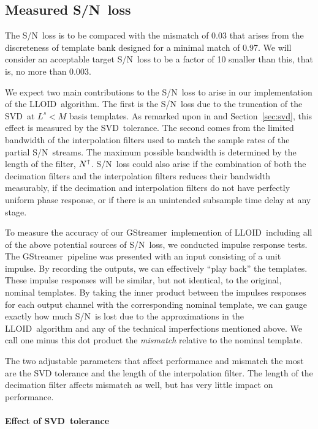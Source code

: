 \documentclass[preprint2]{aastex}
\newcommand{\SNR}{S/N}%
\newcommand{\SVD}{SVD}%
\newcommand{\gstreamer}{GStreamer}
\newcommand{\lloid}{LLOID}%
\begin{document}
\subsection{Measured \SNR\ loss}

The \SNR\ loss is to be compared with the mismatch of 0.03 that arises from the
discreteness of template bank designed for a minimal match of 0.97.  We will consider
an acceptable target \SNR\ loss to be a factor of 10 smaller than this, that is, no more
than 0.003.

We expect two main contributions to the \SNR\ loss to arise in our
implementation of the \lloid\ algorithm.  The first is the \SNR\ loss due to
the truncation of the \SVD\ at $L^s < M$ basis templates.  As remarked upon in
\citet{Cannon:2010p10398} and Section~\ref{sec:svd}, this effect is measured by
the \SVD\ tolerance.  The second comes from the limited bandwidth of the
interpolation filters used to match the sample rates of the partial \SNR\ streams.
The maximum possible bandwidth is determined by the length of the filter,
$N^\shortuparrow$.  \SNR\ loss could also arise if the combination of both the
decimation filters and the interpolation filters reduces their bandwidth
measurably, if the decimation and interpolation filters do not have perfectly uniform
phase response, or if there is an unintended subsample time delay at any stage.

To measure the accuracy of our \gstreamer\ implemention of \lloid\ including all of
the above potential sources of \SNR\ loss, we conducted impulse response tests.  The
\gstreamer\ pipeline was presented with an input consisting of a unit impulse.  By
recording the outputs, we can effectively ``play back'' the templates.  These impulse
responses will be similar, but not identical, to the original, nominal templates.
By taking the inner product between the impulses responses for each output 
channel with the corresponding nominal template, we can gauge exactly how much \SNR\
is lost due to the approximations in the \lloid\ algorithm and any of the technical
imperfections mentioned above.  We call one minus this dot product the \emph{mismatch}
relative to the nominal template.

The two adjustable parameters that affect performance and mismatch the most are
the SVD tolerance and the length of the interpolation filter.  The length of the
decimation filter affects mismatch as well, but has very little impact on
performance.

\paragraph{Effect of \SVD\ tolerance}
\end{document}
